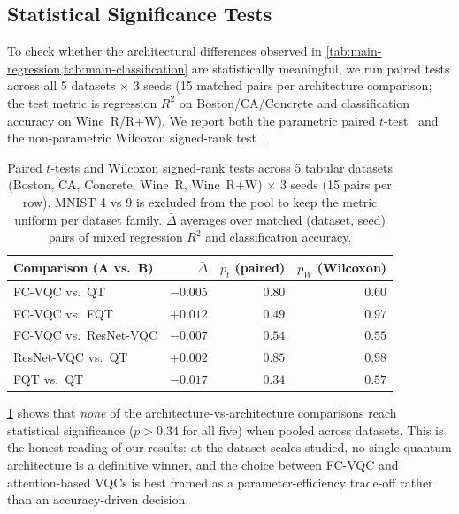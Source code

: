 \documentclass[10pt,conference]{IEEEtran}
\begin{document}
\subsection{Statistical Significance Tests}
\label{sec:results-ttest}

To check whether the architectural differences observed in \cref{tab:main-regression,tab:main-classification} are statistically meaningful, we run paired tests across all 5 datasets $\times$ 3 seeds (15 matched pairs per architecture comparison; the test metric is regression $R^2$ on Boston/CA/Concrete and classification accuracy on Wine~R/R+W). We report both the parametric paired $t$-test~\cite{student1908} and the non-parametric Wilcoxon signed-rank test~\cite{wilcoxon1945}.

\begin{table}[t]
\centering
\caption{Paired $t$-tests and Wilcoxon signed-rank tests across 5 tabular datasets (Boston, CA, Concrete, Wine~R, Wine~R+W) $\times$ 3 seeds (15 pairs per row). MNIST 4 vs 9 is excluded from the pool to keep the metric uniform per dataset family. $\bar{\Delta}$ averages over matched (dataset, seed) pairs of mixed regression $R^2$ and classification accuracy.}
\label{tab:ttest}
\small
\begin{tabular}{lrrr}
\toprule
Comparison (A vs.\ B) & $\bar{\Delta}$ & $p_t$ (paired) & $p_W$ (Wilcoxon) \\
\midrule
FC-VQC vs.\ QT          & $-0.005$ & $0.80$ & $0.60$ \\
FC-VQC vs.\ FQT         & $+0.012$ & $0.49$ & $0.97$ \\
FC-VQC vs.\ ResNet-VQC  & $-0.007$ & $0.54$ & $0.55$ \\
ResNet-VQC vs.\ QT      & $+0.002$ & $0.85$ & $0.98$ \\
FQT vs.\ QT             & $-0.017$ & $0.34$ & $0.57$ \\
\bottomrule
\end{tabular}
\vspace{-5pt}
\end{table}

\cref{tab:ttest} shows that \emph{none} of the architecture-vs-architecture comparisons reach statistical significance ($p > 0.34$ for all five) when pooled across datasets.
This is the honest reading of our results: at the dataset scales studied, no single quantum architecture is a definitive winner, and the choice between FC-VQC and attention-based VQCs is best framed as a parameter-efficiency trade-off rather than an accuracy-driven decision.
\end{document}
